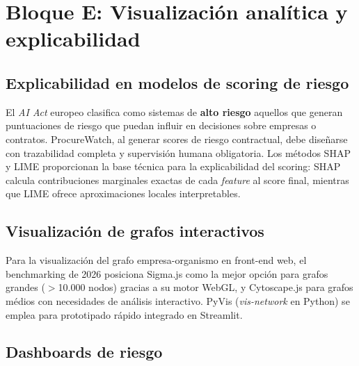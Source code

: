 \documentclass[11pt,a4paper,spanish]{book}
\numberwithin{equation}{chapter}
\numberwithin{figure}{chapter}
\begin{document}

\section{Bloque E: Visualizaci{\'o}n anal{\'i}tica y explicabilidad}

\subsection{Explicabilidad en modelos de scoring de riesgo}

El \textit{AI Act} europeo \cite{AIAct2024} clasifica como sistemas de \textbf{alto riesgo} aquellos que generan puntuaciones de riesgo que puedan influir en decisiones sobre empresas o contratos. ProcureWatch, al generar scores de riesgo contractual, debe dise{\~n}arse con trazabilidad completa y supervisi{\'o}n humana obligatoria. Los m{\'e}todos SHAP y LIME \cite{SHAPLIMEWiley2025} proporcionan la base t{\'e}cnica para la explicabilidad del scoring: SHAP calcula contribuciones marginales exactas de cada \textit{feature} al score final, mientras que LIME ofrece aproximaciones locales interpretables.

\subsection{Visualizaci{\'o}n de grafos interactivos}

Para la visualizaci{\'o}n del grafo empresa-organismo en front-end web, el benchmarking de 2026 \cite{GraphVizPkgPulse2026} posiciona Sigma.js como la mejor opci{\'o}n para grafos grandes ($>$10.000 nodos) gracias a su motor WebGL, y Cytoscape.js para grafos m{\'e}dios con necesidades de an{\'a}lisis interactivo. PyVis (\textit{vis-network} en Python) se emplea para prototipado r{\'a}pido integrado en Streamlit.

\subsection{Dashboards de riesgo}
\end{document}
